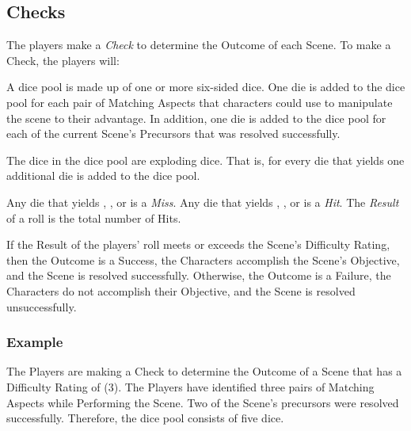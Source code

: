 \documentclass[12pt, a5paper, parskip=half-]{scrartcl}
\begin{document}
\subsection*{Checks}
The players make a \emph{Check} to determine the Outcome of each Scene. To make a Check, the players will:
\begin{description}[leftmargin=0pt]
\item[Assemble a Dice Pool]
     A dice pool is made up of one or more six-sided dice.
     One die is added to the dice pool for each pair of Matching Aspects that characters could use to manipulate the scene to their advantage.
     In addition, one die is added to the dice pool for each of the current Scene's Precursors that was resolved successfully.
 \item[Roll the Dice]
     The dice in the dice pool are exploding dice.
     That is, for every die that yields  one additional die is added to the dice pool.
\item[Compute the Result]
     Any die that yields , , or  is a \emph{Miss}.
     Any die that yields , , or  is a \emph{Hit}.
     The \emph{Result} of a roll is the total number of Hits.
\item[Determine the Outcome]
     If the Result of the players' roll meets or exceeds the Scene's Difficulty Rating, then the Outcome is a Success, the Characters accomplish the Scene's Objective, and the Scene is resolved successfully.
     Otherwise, the Outcome is a Failure, the Characters do not accomplish their Objective, and the Scene is resolved unsuccessfully.
 \end{description}

\newpage

\subsubsection*{Example}
The Players are making a Check to determine the Outcome of a Scene that has a Difficulty Rating of (3).
The Players have identified three pairs of Matching Aspects while Performing the Scene.
Two of the Scene's precursors were resolved successfully.
Therefore, the dice pool consists of five dice.
\end{document}
